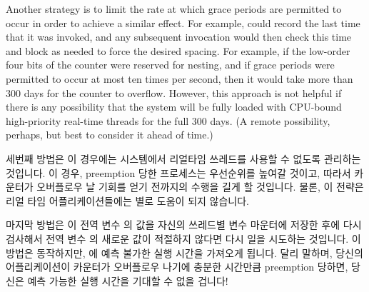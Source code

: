 {	Another strategy is to limit the rate at which grace periods are
	permitted to occur in order to achieve a similar effect.
	For example,  could record the last time
	that it was invoked, and any subsequent invocation would then
	check this time and block as needed to force the desired
	spacing.
	For example, if the low-order four bits of the counter were
	reserved for nesting, and if grace periods were permitted to
	occur at most ten times per second, then it would take more
	than 300 days for the counter to overflow.
	However, this approach is not helpful if there is any possibility
	that the system will be fully loaded with CPU-bound high-priority
	real-time threads for the full 300 days.
	(A remote possibility, perhaps, but best to consider it ahead
	of time.)
	\fi

	세번째 방법은 이 경우에는 시스템에서 리얼타임 쓰레드를 사용할 수 없도록
	관리하는 것입니다.
	이 경우, preemption 당한 프로세스는 우선순위를 높여갈 것이고, 따라서
	카운터가 오버플로우 날 기회를 얻기 전까지의 수행을 길게 할 것입니다.
	물론, 이 전략은 리얼 타임 어플리케이션들에는 별로 도움이 되지 않습니다.

	마지막 방법은  이 전역 변수  의 값을
	자신의 쓰레드별 변수  마운터에 저장한 후에 다시
	검사해서 전역 변수  의 새로운 값이 적절하지 않다면 다시
	일을 시도하는 것입니다.
	이 방법은 동작하지만,  에 예측 불가한 실행 시간을
	가져오게 됩니다.
	달리 말하며, 당신의 어플리케이션이 카운터가 오버플로우 나기에 충분한
	시간만큼 preemption 당하면, 당신은 예측 가능한 실행 시간을 기대할 수
	없을 겁니다!
	\iffalse

	A third approach is to administratively abolish real-time threads
	from the system in question.
	In this case, the preempted process will age up in priority,
	thus getting to run long before the counter had a chance to
	overflow.
	Of course, this approach is less than helpful for real-time
	applications.

	A final approach would be for \co{rcu_read_lock()} to recheck
	the value of the global \co{rcu_gp_ctr} after storing to its
	per-thread \co{rcu_reader_gp} counter, retrying if the new
	value of the global \co{rcu_gp_ctr} is inappropriate.
	This works, but introduces non-deterministic execution time
	into \co{rcu_read_lock()}.
	On the other hand, if your application is being preempted long
	enough for the counter to overflow, you have no hope of
	deterministic execution time in any case!
	\fi

} \QuickQuizEnd

